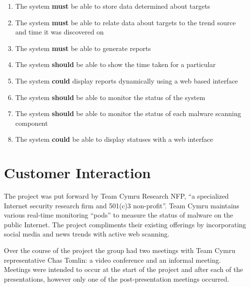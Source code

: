 \begin{enumerate}
    \item The system \textbf{must} be able to store data determined about targets
    \item The system \textbf{must} be able to relate data about targets to the trend source and time it was discovered on
    \item The system \textbf{must} be able to generate reports
    \item The system \textbf{should} be able to show the time taken for a particular 
    \item The system \textbf{could} display reports dynamically using a web based interface
    \item The system \textbf{should} be able to monitor the status of the system
    \item The system \textbf{should} be able to monitor the status of each malware scanning component
    \item The system \textbf{could} be able to display statuses with a web interface
\end{enumerate}

\section{Customer Interaction}
The project was put forward by Team Cymru Research NFP, ``a specialized Internet security research firm and 501(c)3 non-profit''\cite{team-cymru}. Team Cymru maintains various real-time monitoring ``pods'' to measure the status of malware on the public Internet. The project compliments their existing offerings by incorporating social media and news trends with active web scanning.

Over the course of the project the group had two meetings with Team Cymru representative Chas Tomlin: a video conference and an informal meeting.  Meetings were intended to occur at the start of the project and after each of the presentations, however only one of the post-presentation meetings occurred.


